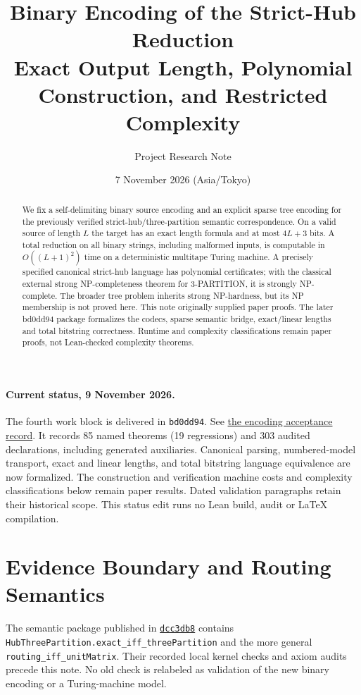 \documentclass[11pt]{article}
\title{Binary Encoding of the Strict-Hub Reduction\\
  \large Exact Output Length, Polynomial Construction, and Restricted Complexity}
\author{Project Research Note}
\date{7 November 2026 (Asia/Tokyo)}
\theoremstyle{remark}
\newcommand{\code}[1]{\nolinkurl{#1}}
\begin{document}
\maketitle

\paragraph{Current status, 9 November 2026.}
The fourth work block is delivered in \code{bd0dd94}. See
\href{https://github.com/huam54925-cpu/uav-routing-certification/blob/bd0dd940e3ba73d6e1c0892aa3b377d60950eccf/docs/HUB_REDUCTION_ENCODING_STATUS.md}{the encoding acceptance record}.
It records 85 named theorems (19 regressions) and 303 audited declarations,
including generated auxiliaries. Canonical parsing, numbered-model transport,
exact and linear lengths, and total bitstring language equivalence are now
formalized. The construction and verification machine costs and complexity
classifications below remain paper results. Dated validation paragraphs retain
their historical scope. This status edit runs no Lean build, audit or LaTeX compilation.


\begin{abstract}
We fix a self-delimiting binary source encoding and an explicit sparse tree
encoding for the previously verified strict-hub/three-partition semantic
correspondence. On a valid source of length $L$ the target has an exact length
formula and at most $4L+3$ bits. A total reduction on all binary strings,
including malformed inputs, is computable in $O((L+1)^2)$ time on a
deterministic multitape Turing machine. A precisely specified canonical
strict-hub language has polynomial certificates; with the classical external
strong NP-completeness theorem for 3-PARTITION, it is strongly NP-complete.
The broader tree problem inherits strong NP-hardness, but its NP membership
is not proved here. This note originally supplied paper proofs. The later bd0dd94 package
formalizes the codecs, sparse semantic bridge, exact/linear lengths and total
bitstring correctness. Runtime and complexity classifications remain paper
proofs, not Lean-checked complexity theorems.
\end{abstract}

\section{Evidence Boundary and Routing Semantics}
\label{sec:semantics}

The semantic package published in
\href{https://github.com/huam54925-cpu/uav-routing-certification/commit/dcc3db87805957680d7dbbba50f8eb6f8c7ef78e}{\code{dcc3db8}}
contains \code{HubThreePartition.exact_iff_threePartition} and the more general
\code{routing_iff_unitMatrix}. Their recorded local kernel checks and axiom
audits precede this note. No old check is relabeled as validation of the new
binary encoding or a Turing-machine model.
\end{document}
